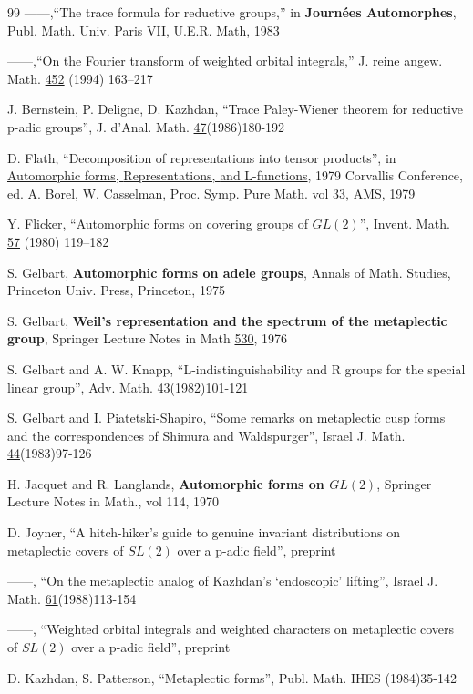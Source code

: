 \begin{thebibliography}{99}
 ------,``The trace formula for reductive groups,'' in
{\bf Journ\'ees Automorphes}, Publ. Math. Univ. Paris VII,
U.E.R. Math, 1983

 ------,``On the Fourier transform of weighted
orbital integrals,'' J. reine angew. Math. \underline{452} (1994) 163--217

 J. Bernstein, P. Deligne, D. Kazhdan, ``Trace
Paley-Wiener theorem for
reductive p-adic groups'', J. d'Anal. Math. \underline{47}(1986)180-192

 D. Flath, ``Decomposition of representations into tensor
products'', in
\underline{Automorphic forms, }
\underline{Representations, } \underline{and
L-functions}, 1979 Corvallis Conference, ed. A. Borel, W. Casselman,
Proc. Symp. Pure Math. vol 33, AMS, 1979

Y. Flicker, ``Automorphic forms on covering groups of $GL(2)$'', Invent.
Math. \underline{57} (1980) 119--182

 S. Gelbart, {\bf Automorphic forms on adele groups}, 
Annals of
Math. Studies, Princeton Univ. Press, Princeton, 1975

 S. Gelbart, {\bf Weil's representation and the 
spectrum of the metaplectic group},
Springer Lecture Notes in Math \underline{530}, 1976

 S. Gelbart and A. W. Knapp, ``L-indistinguishability and R 
groups for the
special linear group'', Adv. Math. 43(1982)101-121

 S. Gelbart and I. Piatetski-Shapiro, ``Some remarks 
on metaplectic cusp
forms and the correspondences of Shimura and Waldspurger'', Israel 
J. Math.
\underline{44}(1983)97-126

 H. Jacquet and R. Langlands,
{\bf Automorphic forms on $GL(2)$}, Springer Lecture Notes in Math.,
vol 114, 1970

 D. Joyner, 
``A hitch-hiker's guide to genuine invariant distributions
on metaplectic covers of $SL(2)$ over a p-adic field'', preprint

 ------, 
``On the metaplectic analog of Kazhdan's `endoscopic' lifting'', Israel
J. Math. \underline{61}(1988)113-154

 ------, 
``Weighted orbital integrals and weighted characters
on metaplectic covers of $SL(2)$ over a p-adic field'', preprint

 D. Kazhdan, S. Patterson, ``Metaplectic forms'', Publ. Math.
IHES (1984)35-142


\end{thebibliography}
